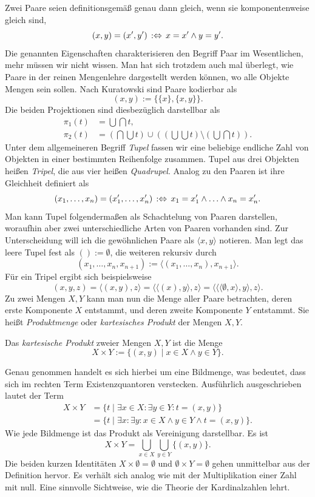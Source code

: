 Zwei Paare seien definitionsgemäß genau dann gleich, wenn sie
komponentenweise gleich sind,%
\[(x,y) = (x',y')\,:\Leftrightarrow\, x=x'\land y=y'.\]
Die genannten Eigenschaften charakterisieren den Begriff Paar
im Wesentlichen, mehr müssen wir nicht wissen. Man hat sich trotzdem
auch mal überlegt, wie Paare in der reinen Mengenlehre dargestellt
werden können, wo alle Objekte Mengen sein sollen. Nach Kuratowski
sind Paare kodierbar als%
\[(x,y) := \{\{x\},\{x,y\}\}.\]
Die beiden Projektionen sind diesbezüglich darstellbar als
\begin{align*}
\pi_1(t) &= \textstyle\bigcup\bigcap t,\\
\pi_2(t) &= \textstyle(\bigcap\bigcup t)\cup
  ((\bigcup\bigcup t)\setminus (\bigcup\bigcap t)).
\end{align*}
Unter dem allgemeineren Begriff \emph{Tupel} fassen
wir eine beliebige endliche Zahl von Objekten in einer bestimmten
Reihenfolge zusammen. Tupel aus drei Objekten heißen \emph{Tripel},
die aus vier heißen \emph{Quadrupel}. Analog zu den Paaren ist ihre
Gleichheit definiert als%
\[(x_1,\ldots,x_n) = (x_1',\ldots,x_n')
\,:\Leftrightarrow\, x_1=x_1'\land\ldots\land x_n=x_n'.\]
Man kann Tupel folgendermaßen als Schachtelung von Paaren
darstellen, woraufhin aber zwei unterschiedliche Arten von Paaren
vorhanden sind. Zur Unterscheidung will ich die gewöhnlichen Paare
als $\langle x,y\rangle$ notieren. Man legt das leere Tupel fest
als $() := \emptyset$, die weiteren rekursiv durch
\[(x_1,\ldots, x_n, x_{n+1}) := \langle (x_1,\ldots,x_n), x_{n+1}\rangle.\]
Für ein Tripel ergibt sich beispielsweise
\[(x,y,z) = \langle (x,y),z\rangle = \langle\langle (x), y\rangle, z\rangle
= \langle\langle\langle\emptyset,x\rangle, y\rangle, z\rangle.\]
Zu zwei Mengen $X,Y$ kann man nun die Menge aller Paare betrachten,
deren erste Komponente $X$ entstammt, und deren zweite
Komponente $Y$ entstammt. Sie heißt \emph{Produktmenge}
oder \emph{kartesisches Produkt}
der Mengen $X,Y$.
\begin{Definition}[Produktmenge]\newlinefirst
Das \emph{kartesische Produkt} zweier Mengen $X,Y$ ist die Menge
\[X\times Y := \{(x,y)\mid x\in X\land y\in Y\}.\]
\end{Definition}
Genau genommen handelt es sich hierbei um eine Bildmenge, was bedeutet,
dass sich im rechten Term Existenzquantoren verstecken. Ausführlich
ausgeschrieben lautet der Term%
\begin{align*}
X\times Y &= \{t\mid\exists x\in X\colon\exists y\in Y\colon t=(x,y)\}\\
&= \{t\mid\exists x\colon\exists y\colon x\in X\land y\in Y\land t=(x,y)\}.
\end{align*}
Wie jede Bildmenge ist das Produkt als Vereinigung darstellbar. Es ist%
\[X\times Y = \bigcup_{x\in X}\bigcup_{y\in Y}\{(x,y)\}.\]
Die beiden kurzen Identitäten $X\times\emptyset = \emptyset$ und
$\emptyset\times Y = \emptyset$ gehen unmittelbar aus der Definition
hervor. Es verhält sich analog wie mit der Multiplikation einer
Zahl mit null. Eine sinnvolle Sichtweise, wie die Theorie der
Kardinalzahlen lehrt.

